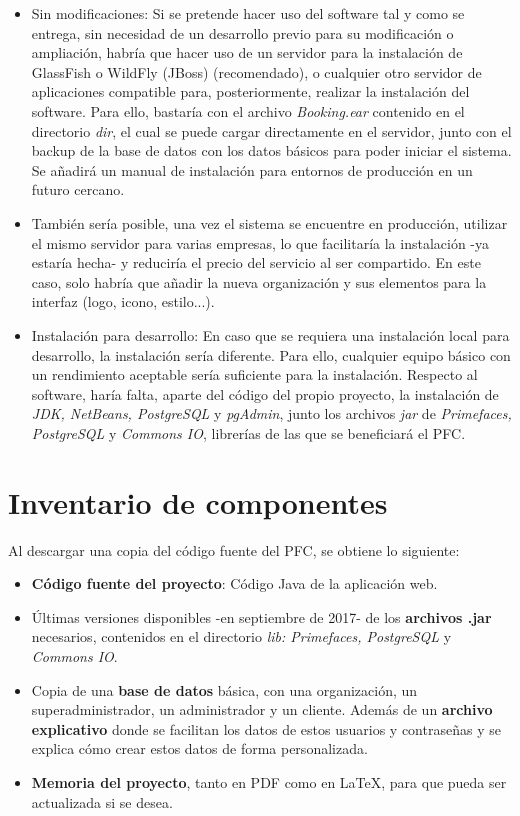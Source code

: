 \begin{itemize} 
\item Sin modificaciones: Si se pretende hacer uso del software tal y como se entrega, sin necesidad de un desarrollo previo para su modificación o ampliación, habría que hacer uso de un servidor para la instalación de GlassFish o WildFly (JBoss) (recomendado), o cualquier otro servidor de aplicaciones compatible para, posteriormente, realizar la instalación del software. Para ello, bastaría con el archivo \textit{Booking.ear} contenido en el directorio \textit{dir}, el cual se puede cargar directamente en el servidor, junto con el backup de la base de datos con los datos básicos para poder iniciar el sistema. Se añadirá un manual de instalación para entornos de producción en un futuro cercano. 
\item También sería posible, una vez el sistema se encuentre en producción, utilizar el mismo servidor para varias empresas, lo que facilitaría la instalación -ya estaría hecha- y reduciría el precio del servicio al ser compartido. En este caso, solo habría que añadir la nueva organización y sus elementos para la interfaz (logo, icono, estilo...). 
\item Instalación para desarrollo: En caso que se requiera una instalación local para desarrollo, la instalación sería diferente. Para ello, cualquier equipo básico con un rendimiento aceptable sería suficiente para la instalación. Respecto al software, haría falta, aparte del código del propio proyecto, la instalación de \textit{JDK, NetBeans, PostgreSQL} y \textit{pgAdmin}, junto los archivos \textit{jar} de \textit{Primefaces, PostgreSQL} y \textit{Commons IO}, librerías de las que se beneficiará el PFC.
\end{itemize} 


\section{Inventario de componentes}

Al descargar una copia del código fuente del PFC, se obtiene lo siguiente: 

\begin{itemize}
\item \textbf{Código fuente del proyecto}: Código Java de la aplicación web.
\item Últimas versiones disponibles -en septiembre de 2017- de los \textbf{archivos .jar} necesarios, contenidos en el directorio \textit{lib: Primefaces, PostgreSQL} y \textit{Commons IO}.
\item Copia de una \textbf{base de datos} básica, con una organización, un superadministrador, un administrador y un cliente. Además de un \textbf{archivo explicativo} donde se facilitan los datos de estos usuarios y contraseñas y se explica cómo crear estos datos de forma personalizada. 
\item \textbf{Memoria del proyecto}, tanto en PDF como en \LaTeX, para que pueda ser actualizada si se desea. 
\end{itemize}


